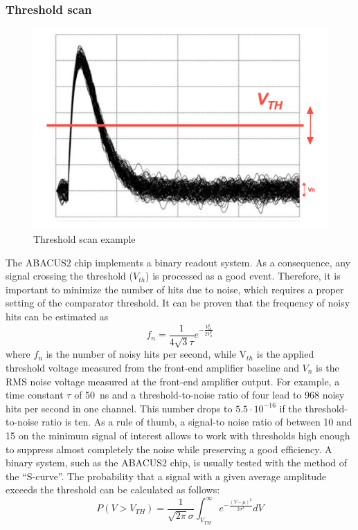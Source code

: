 \subsubsection{Threshold scan}\label{considerations}
\begin{figure}[H]
	\centering
	\includegraphics[width=0.7\linewidth]{IMG/ch5/DataDacConfig/tscan_sketch2}
	\caption{Threshold scan example\cite{rivetti}}
	\label{fig:tscansketch}
\end{figure}
\noindent The ABACUS2 chip implements a binary readout system. As a consequence, any signal crossing the threshold ($V_{th}$) is processed as a good event\cite{rivetti}.
Therefore, it is important to minimize the number of hits due to noise, which requires a proper setting of the comparator threshold. It can be proven that the frequency of noisy hits can be estimated as
\begin{equation}
	f_n=\frac{1}{4 \sqrt{3} \tau} e^{- \frac{V^2_{th}}{2V^2_n}} 
\end{equation}
\noindent where $f_n$ is the number of noisy hits per second, while V$_{th}$ is the applied threshold voltage measured from the front-end amplifier baseline and $V_{n}$ is the RMS noise voltage measured at the front-end amplifier output.
For example, a time constant $\tau$ of 50~ns and a threshold-to-noise ratio of four lead to 968 noisy hits per second in one channel.
This number drops to $5.5\cdot10^{-16}$ if the threshold-to-noise ratio is ten.
As a rule of thumb, a signal-to noise ratio of between 10 and 15 on the minimum signal of interest allows to work with thresholds high enough to suppress almost completely the noise while preserving a good efficiency.
A binary system, such as the ABACUS2 chip, is usually tested with the method of the “S-curve”.
The probability that a signal with a given average amplitude exceeds
the threshold can be calculated as follows:
\begin{equation}
	P(V>V_{TH}) = \frac{1}{\sqrt{2\pi}\sigma} \int_{V_{TH}}^{\infty} e^{- \frac{(V-\mu)^2}{2\sigma^2}} dV
\end{equation}
